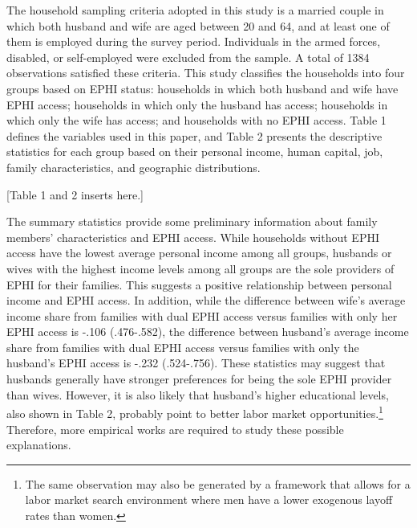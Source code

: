\documentclass[legno,11pt]{article}
\begin{document}
The household sampling criteria adopted in this study is a married
couple in which both husband and wife are aged between 20 and 64,
and at least one of them is employed during the survey period.
Individuals in the armed forces, disabled, or self-employed were
excluded from the sample. A total of 1384 observations satisfied
these criteria. This study classifies the households into four
groups based on EPHI status: households in which both husband and
wife have EPHI access; households in which only the husband has
access; households in which only the wife has access; and households
with no EPHI access. Table 1 defines the variables used in this
paper, and Table 2 presents the descriptive statistics for each
group based on their personal income, human capital, job, family
characteristics, and geographic distributions.
\par

\begin{center}
[Table 1 and 2 inserts here.]
\end{center}

The summary statistics provide some preliminary information about
family members' characteristics and EPHI access. While households
without EPHI access have the lowest average personal income among
all groups, husbands or wives with the highest income levels among
all groups are the sole providers of EPHI for their families. This
suggests a positive relationship between personal income and EPHI
access. In addition, while the difference between wife's average
income share from families with dual EPHI access versus families
with only her EPHI access is -.106 (.476-.582), the difference
between husband's average income share from families with dual EPHI
access versus families with only the husband's EPHI access is -.232
(.524-.756). These statistics may suggest that husbands generally
have stronger preferences for being the sole EPHI provider than
wives. However, it is also likely that husband's higher educational
levels, also shown in Table 2, probably point to better labor market
opportunities.\footnote{The same observation may also be generated
by a framework that allows for a labor market search environment
where men have a lower exogenous layoff rates than women.}
Therefore, more empirical works are required to study these
possible explanations.
\par
\end{document}
